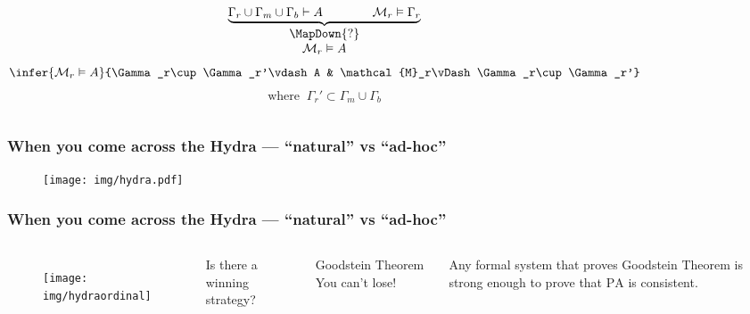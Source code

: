 \documentclass[UTF8,11pt,colorlinks,compress,openany]{beamer}%
\begin{document}
\begin{frame}
\begin{figure}
{\begin{minipage}{\textwidth}
		\end{minipage}}
	\end{figure}
	\begin{columns}
			\[
			\begin{matrix}
			\underbrace{\Gamma_r\cup\Gamma_m\cup\Gamma_b\vdash A\qquad \qquad\mathcal{M}_r\vDash\Gamma_r}\\
			\MapDown{?}\\
			\mathcal{M}_r\vDash A
			\end{matrix}
			\]
			\[
			\infer{\mathcal{M}_r\vDash A}{\Gamma_r\cup\Gamma_r'\vdash A
				& \mathcal{M}_r\vDash\Gamma_r\cup\Gamma_r'}
			\]
			\[\text{where}\;\;\Gamma_r'\subset\Gamma_m\cup\Gamma_b\]
	\end{columns}
\end{frame}

\begin{frame}\frametitle{\small When you come across the Hydra --- ``natural'' vs ``ad-hoc''}
	\begin{figure}
		\texttt{[image: img/hydra.pdf]}
	\end{figure}
\end{frame}

\begin{frame}\frametitle{\small When you come across the Hydra --- ``natural'' vs ``ad-hoc''}
	\begin{columns}
		\column{0.5\textwidth}
			\begin{figure}
				\texttt{[image: img/hydraordinal]}
			\end{figure}
		\column{0.5\textwidth}
			\begin{problem}
				Is there a winning strategy?
			\end{problem}
			\begin{block}{Goodstein Theorem}
				You can't lose!
			\end{block}
			\begin{theorem}
				Any formal system that proves Goodstein Theorem is strong enough to prove that $\mathrm{PA}$ is consistent.
			\end{theorem}
	\end{columns}
\end{frame}
\end{document}
